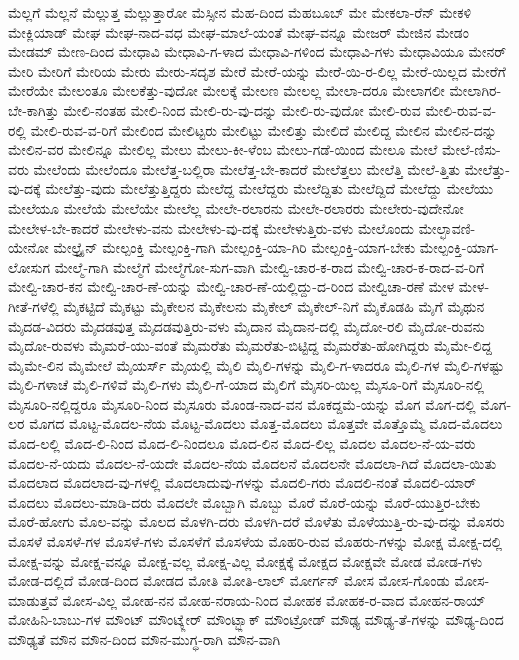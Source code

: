 {ಮೆಲ್ಲಗೆ
ಮೆಲ್ಲನೆ
ಮೆಲ್ಲುತ್ತ
ಮೆಲ್ಲುತ್ತಾರೋ
ಮೆಸ್ಸೀನ
ಮೆಹ-ದಿಂದ
ಮೆಹಬೂಬ್
ಮೇ
ಮೇಕಲಾ-ರೆನ್
ಮೇಕಳಿ
ಮೇಕ್ಲಿಯಾಡ್
ಮೇಘ
ಮೇಘ-ನಾದ-ವಧ
ಮೇಘ-ಮಾಲೆ-ಯಂತೆ
ಮೇಘ-ವನ್ನೂ
ಮೇಜರ್
ಮೇಜಿನ
ಮೇಡಂ
ಮೇಡಮ್
ಮೇಣ-ದಿಂದ
ಮೇಧಾವಿ
ಮೇಧಾವಿ-ಗ-ಳಾದ
ಮೇಧಾವಿ-ಗಳಿಂದ
ಮೇಧಾವಿ-ಗಳು
ಮೇಧಾವಿಯೂ
ಮೇನರ್
ಮೇರಿ
ಮೇರಿಗೆ
ಮೇರಿಯ
ಮೇರು
ಮೇರು-ಸದೃಶ
ಮೇರೆ
ಮೇರೆ-ಯನ್ನು
ಮೇರೆ-ಯಿ-ರ-ಲಿಲ್ಲ
ಮೇರೆ-ಯಿಲ್ಲದ
ಮೇರೆಗೆ
ಮೇರೆಯೇ
ಮೇಲಂತೂ
ಮೇಲಕೆತ್ತು-ವುದೋ
ಮೇಲಕ್ಕೆ
ಮೇಲಣ
ಮೇಲಲ್ಲ
ಮೇಲಾ-ದರೂ
ಮೇಲಾಗಲೀ
ಮೇಲಾಗಿರ-ಬೇ-ಕಾಗಿತ್ತು
ಮೇಲಿ-ನಂತಹ
ಮೇಲಿ-ನಿಂದ
ಮೇಲಿ-ರು-ವು-ದನ್ನು
ಮೇಲಿ-ರು-ವುದೋ
ಮೇಲಿ-ರುವ
ಮೇಲಿ-ರುವ-ವ-ರಲ್ಲಿ
ಮೇಲಿ-ರುವ-ವ-ರಿಗೆ
ಮೇಲಿಂದ
ಮೇಲಿಟ್ಟರು
ಮೇಲಿಟ್ಟು
ಮೇಲಿತ್ತು
ಮೇಲಿದೆ
ಮೇಲಿದ್ದ
ಮೇಲಿನ
ಮೇಲಿನ-ದನ್ನು
ಮೇಲಿನ-ವರ
ಮೇಲಿನ್ನೂ
ಮೇಲಿಲ್ಲ
ಮೇಲು
ಮೇಲು-ಕೀ-ಳೆಂಬ
ಮೇಲು-ಗಡೆ-ಯಿಂದ
ಮೇಲೂ
ಮೇಲೆ
ಮೇಲೆ-ಣಿಸು-ವರು
ಮೇಲೆಂದು
ಮೇಲೆಂದೂ
ಮೇಲೆತ್ತ-ಬಲ್ಲಿರಾ
ಮೇಲೆತ್ತ-ಬೇ-ಕಾದರೆ
ಮೇಲೆತ್ತಲು
ಮೇಲೆತ್ತಿ
ಮೇಲೆ-ತ್ತಿತು
ಮೇಲೆತ್ತು-ವು-ದಕ್ಕೆ
ಮೇಲೆತ್ತು-ವುದು
ಮೇಲೆತ್ತುತ್ತಿದ್ದರು
ಮೇಲೆದ್ದ
ಮೇಲೆದ್ದರು
ಮೇಲೆದ್ದಿತು
ಮೇಲೆದ್ದಿದೆ
ಮೇಲೆದ್ದು
ಮೇಲೆಯು
ಮೇಲೆಯೂ
ಮೇಲೆಯೆ
ಮೇಲೆಯೇ
ಮೇಲೆಲ್ಲ
ಮೇಲೇ-ರಲಾರನು
ಮೇಲೇ-ರಲಾರರು
ಮೇಲೇರು-ವುದೇನೋ
ಮೇಲೇಳ-ಬೇ-ಕಾದರೆ
ಮೇಲೇಳು-ವನು
ಮೇಲೇಳು-ವು-ದಕ್ಕೆ
ಮೇಲೇಳುತ್ತಿರು-ವಳು
ಮೇಲೊಂದು
ಮೇಲ್ಛಾವಣಿ-ಯೇನೋ
ಮೇಲ್ಟ್ರೈನ್
ಮೇಲ್ಪಂಕ್ತಿ
ಮೇಲ್ಪಂಕ್ತಿ-ಗಾಗಿ
ಮೇಲ್ಪಂಕ್ತಿ-ಯಾ-ಗಿರಿ
ಮೇಲ್ಪಂಕ್ತಿ-ಯಾಗ-ಬೇಕು
ಮೇಲ್ಪಂಕ್ತಿ-ಯಾಗ-ಲೋಸುಗ
ಮೇಲ್ಮೆ-ಗಾಗಿ
ಮೇಲ್ಮೆಗೆ
ಮೇಲ್ಮೆಗೋ-ಸುಗ-ವಾಗಿ
ಮೇಲ್ವಿ-ಚಾರ-ಕ-ರಾದ
ಮೇಲ್ವಿ-ಚಾರ-ಕ-ರಾದ-ವ-ರಿಗೆ
ಮೇಲ್ವಿ-ಚಾರ-ಕನ
ಮೇಲ್ವಿ-ಚಾರ-ಣೆ-ಯನ್ನು
ಮೇಲ್ವಿ-ಚಾರ-ಣೆ-ಯಲ್ಲಿದ್ದು-ದ-ರಿಂದ
ಮೇಲ್ವಿಚಾ-ರಣೆ
ಮೇಳ
ಮೇಳ-ಗೀತೆ-ಗಳೆಲ್ಲಿ
ಮೈಕಟ್ಟಿದೆ
ಮೈಕಟ್ಟು
ಮೈಕೇಲನ
ಮೈಕೇಲನು
ಮೈಕೇಲ್
ಮೈಕೇಲ್-ನಿಗೆ
ಮೈಕೊಡಹಿ
ಮೈಗೆ
ಮೈಥುನ
ಮೈದಡ-ವಿದರು
ಮೈದಡವುತ್ತ
ಮೈದಡವುತ್ತಿರು-ವಳು
ಮೈದಾನ
ಮೈದಾನ-ದಲ್ಲಿ
ಮೈದೋ-ರಲಿ
ಮೈದೋ-ರುವನು
ಮೈದೋ-ರುವಳು
ಮೈಮರೆ-ಯು-ವಂತೆ
ಮೈಮರೆತು
ಮೈಮರೆತು-ಬಿಟ್ಟಿದ್ದ
ಮೈಮರೆತು-ಹೋಗಿದ್ದರು
ಮೈಮೇ-ಲಿದ್ದ
ಮೈಮೇ-ಲಿನ
ಮೈಮೇಲೆ
ಮೈಯರ್ಸ್
ಮೈಯಲ್ಲಿ
ಮೈಲಿ
ಮೈಲಿ-ಗಳನ್ನು
ಮೈಲಿ-ಗ-ಳಾದರೂ
ಮೈಲಿ-ಗಳ
ಮೈಲಿ-ಗಳಷ್ಟು
ಮೈಲಿ-ಗಳಾಚೆ
ಮೈಲಿ-ಗಳಿವೆ
ಮೈಲಿ-ಗಳು
ಮೈಲಿ-ಗೆ-ಯಾದ
ಮೈಲಿಗೆ
ಮೈಸರಿ-ಯಿಲ್ಲ
ಮೈಸೂ-ರಿಗೆ
ಮೈಸೂರಿ-ನಲ್ಲಿ
ಮೈಸೂರಿ-ನಲ್ಲಿದ್ದರೂ
ಮೈಸೂರಿ-ನಿಂದ
ಮೈಸೂರು
ಮೊಂಡ-ನಾದ-ವನ
ಮೊಕದ್ದಮೆ-ಯನ್ನು
ಮೊಗ
ಮೊಗ-ದಲ್ಲಿ
ಮೊಗ-ಲರ
ಮೊಗದ
ಮೊಟ್ಟ-ಮೊದಲ-ನೆಯ
ಮೊಟ್ಟ-ಮೊದಲು
ಮೊತ್ತ-ಮೊದಲು
ಮೊತ್ತವೇ
ಮೊತ್ತೊಮ್ಮೆ
ಮೊದ-ಮೊದಲು
ಮೊದ-ಲಲ್ಲಿ
ಮೊದ-ಲಿ-ನಿಂದ
ಮೊದ-ಲಿ-ನಿಂದಲೂ
ಮೊದ-ಲಿನ
ಮೊದ-ಲಿಲ್ಲ
ಮೊದಲ
ಮೊದಲ-ನೆ-ಯ-ವರು
ಮೊದಲ-ನೆ-ಯದು
ಮೊದಲ-ನೆ-ಯದೇ
ಮೊದಲ-ನೆಯ
ಮೊದಲನೆ
ಮೊದಲನೇ
ಮೊದಲಾ-ಗಿದೆ
ಮೊದಲಾ-ಯಿತು
ಮೊದಲಾದ
ಮೊದಲಾದ-ವು-ಗಳಲ್ಲಿ
ಮೊದಲಾದುವು-ಗಳನ್ನು
ಮೊದಲಿ-ಗರು
ಮೊದಲಿ-ನಂತೆ
ಮೊದಲಿ-ಯಾರ್
ಮೊದಲು
ಮೊದಲು-ಮಾಡಿ-ದರು
ಮೊದಲೇ
ಮೊಬ್ಬಾಗಿ
ಮೊಬ್ಬು
ಮೊರೆ
ಮೊರೆ-ಯನ್ನು
ಮೊರೆ-ಯುತ್ತಿರ-ಬೇಕು
ಮೊರೆ-ಹೋಗು
ಮೊಲ-ವನ್ನು
ಮೊಲದ
ಮೊಳಗಿ-ದರು
ಮೊಳಗಿ-ದರೆ
ಮೊಳೆತು
ಮೊಳೆಯುತ್ತಿ-ರು-ವು-ದನ್ನು
ಮೊಸರು
ಮೊಸಳೆ
ಮೊಸಳೆ-ಗಳ
ಮೊಸಳೆ-ಗಳು
ಮೊಸಳೆಗೆ
ಮೊಸಳೆಯ
ಮೊಹರಿ-ರುವ
ಮೊಹರು-ಗಳನ್ನು
ಮೋಕ್ಷ
ಮೋಕ್ಷ-ದಲ್ಲಿ
ಮೋಕ್ಷ-ವನ್ನು
ಮೋಕ್ಷ-ವನ್ನೂ
ಮೋಕ್ಷ-ವಲ್ಲ
ಮೋಕ್ಷ-ವಿಲ್ಲ
ಮೋಕ್ಷಕ್ಕೆ
ಮೋಕ್ಷದ
ಮೋಕ್ಷವೇ
ಮೋಡ
ಮೋಡ-ಗಳು
ಮೋಡ-ದಲ್ಲಿದೆ
ಮೋಡ-ದಿಂದ
ಮೋಡದ
ಮೋತಿ
ಮೋತಿ-ಲಾಲ್
ಮೋರ್ಗನ್
ಮೋಸ
ಮೋಸ-ಗೊಂಡು
ಮೋಸ-ಮಾಡುತ್ತವೆ
ಮೋಸ-ವಿಲ್ಲ
ಮೋಹ-ನನ
ಮೋಹ-ನರಾಯ-ನಿಂದ
ಮೋಹಕ
ಮೋಹಕ-ರ-ವಾದ
ಮೋಹನ-ರಾಯ್
ಮೋಹಿನಿ-ಬಾಬು-ಗಳ
ಮೌಂಟ್
ಮೌಂಟ್ಕ್ಲೇರ್
ಮೌಂಟ್ಬ್ಲಾಕ್
ಮೌಂಟ್ರೋಡ್
ಮೌಢ್ಯ
ಮೌಢ್ಯ-ತೆ-ಗಳನ್ನು
ಮೌಢ್ಯ-ದಿಂದ
ಮೌಢ್ಯತೆ
ಮೌನ
ಮೌನ-ದಿಂದ
ಮೌನ-ಮುಗ್ಧ-ರಾಗಿ
ಮೌನ-ವಾಗಿ
}

